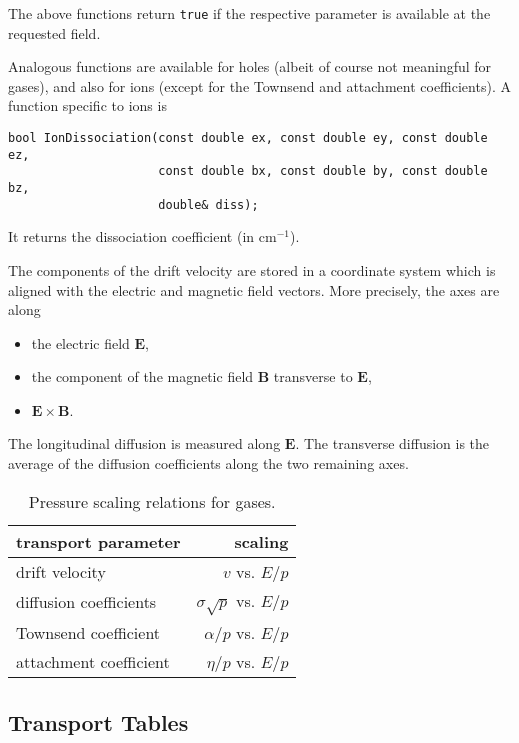 The above functions return \texttt{true} if the respective parameter 
is available at the requested field.  

Analogous functions are available for holes 
(albeit of course not meaningful for gases), and also for ions 
(except for the Townsend and attachment coefficients). 
A function specific to ions is
\begin{lstlisting}
bool IonDissociation(const double ex, const double ey, const double ez,
                     const double bx, const double by, const double bz,
                     double& diss);
\end{lstlisting}
It returns the dissociation coefficient (in cm\(^{-1}\)). 

The components of the drift velocity are stored in a coordinate system 
which is aligned with the electric and magnetic field vectors.
More precisely, the axes are along
\begin{itemize}
  \item
  the electric field \(\mathbf{E}\),
  \item
  the component of the magnetic field \(\mathbf{B}\) transverse to 
  \(\mathbf{E}\), 
  \item
  \(\mathbf{E} \times \mathbf{B}\).
\end{itemize}
The longitudinal diffusion is measured along \(\mathbf{E}\).
The transverse diffusion is the average of the diffusion coefficients 
along the two remaining axes.

\begin{table}
  \centering
  \begin{tabular}{l r}
    \toprule
    transport parameter & scaling \\
    \midrule
    drift velocity & \(v\) vs. \(E/p\) \\
    diffusion coefficients & \(\sigma\sqrt{p}\) vs. \(E/p\) \\
    Townsend coefficient & \(\alpha / p\) vs. \(E/p\) \\
    attachment coefficient & \(\eta / p\) vs. \(E/p\) \\ 
    \bottomrule
  \end{tabular}
  \caption{Pressure scaling relations for gases.}
  \label{Tab:PressureScaling}
\end{table}

\subsection{Transport Tables}


